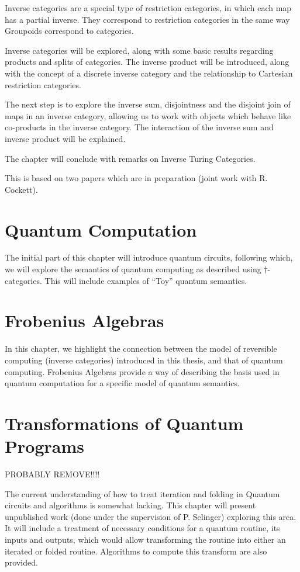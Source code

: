 Inverse categories are a special type of restriction categories, in which each map has a partial
inverse. They correspond to restriction categories in the same way Groupoids correspond to
categories.

Inverse categories will be explored, along with some basic results regarding products and splits of
categories. The inverse product will be introduced, along with the concept of a discrete inverse
category and the relationship to Cartesian restriction categories.

The next step is to explore the inverse sum, disjointness and the disjoint join of maps in an
inverse category, allowing us to work with objects which behave like co-products in the inverse
category. The interaction of the inverse sum and inverse product will be explained.

The chapter will conclude with remarks on Inverse Turing Categories.

This is based on two papers which are in preparation (joint work with R. Cockett).

\section*{Quantum Computation}
The initial part of this chapter will introduce quantum circuits, following which, we will explore
the semantics of quantum computing as described using $\dagger$-categories. This will include
examples of ``Toy'' quantum semantics.

\section*{Frobenius Algebras}

In this chapter, we highlight the connection between the model of reversible computing (inverse
categories) introduced in this thesis, and that of quantum computing. Frobenius Algebras provide a
way of describing the basis used in quantum computation for a specific model of quantum semantics.

\section*{Transformations of Quantum Programs}

PROBABLY REMOVE!!!!

The current understanding of how to treat iteration and folding in Quantum circuits and algorithms
is somewhat lacking. This chapter will present unpublished work (done under the supervision of P.
Selinger) exploring this area. It will include a treatment of necessary conditions for a quantum
routine, its inputs and outputs, which would allow transforming the routine into either an iterated
or folded routine. Algorithms to compute this transform are also provided.

